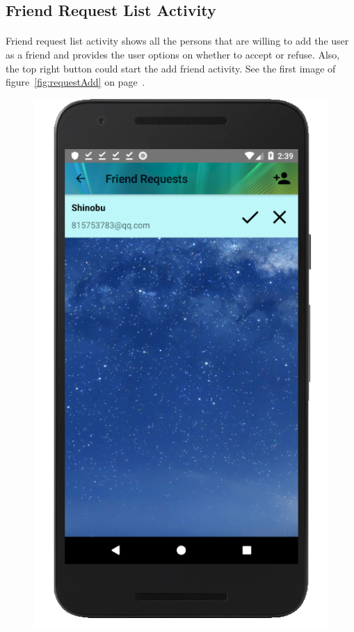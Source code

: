 \documentclass[12pt]{article}
\begin{document}
\subsection{Friend Request List Activity}
\paragraph{}
Friend request list activity shows all the persons that are willing to add the user as a friend and provides the user options on whether to accept or refuse. Also, the top right button could start the add friend activity. See the first image of figure~\ref{fig:requestAdd} on page~\pageref{fig:requestAdd}.
\begin{figure}
	\centering
	\includegraphics[scale=0.25]{FriendRequest.png}

\end{figure}
\end{document}
